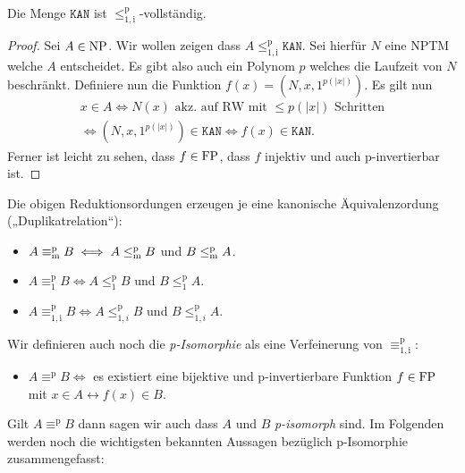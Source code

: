\begin{lemma}
    Die Menge $\mathtt{KAN}$ ist $\leq_\mathrm{1,i}^\mathrm{p}$-vollständig.
\end{lemma}
\begin{proof}
    Sei $A\in\mathrm{NP}$. Wir wollen zeigen dass $A \leq_\mathrm{1,i}^\mathrm{p} \mathtt{KAN}$. Sei hierfür $N$ eine NPTM welche $A$ entscheidet. Es gibt also auch ein Polynom $p$ welches die Laufzeit von $N$ beschränkt.
    Definiere nun die Funktion $f(x) = (N, x, 1^{p(|x|)})$. Es gilt nun
    \begin{gather*}
        x\in A \iff N(x)\text{ akz. auf RW mit $\leq p(|x|)$ Schritten}\\
        \iff (N, x, 1^{p(|x|)}) \in \mathtt{KAN} \iff f(x) \in \mathtt{KAN}.
    \end{gather*}
    Ferner ist leicht zu sehen, dass $f\in \mathrm{FP}$, dass $f$ injektiv und auch p-invertierbar ist.
\end{proof}

Die obigen Reduktionsordungen erzeugen je eine kanonische Äquivalenzordung („Duplikatrelation“):
\begin{itemize}
    \item $A\equiv_\mathrm{m}^\mathrm{p} B \iff A\leq_\mathrm{m}^\mathrm{p} B$ und $B\leq_\mathrm{m}^\mathrm{p} A$.
    \item $A\equiv_\mathrm{1}^\mathrm{p} B \iff A\leq_1^\mathrm{p} B$ und $B\leq_1^\mathrm{p} A$.
    \item $A\equiv_\mathrm{1,i}^\mathrm{p} B \iff A\leq_{1,i}^\mathrm{p} B$ und $B\leq_{1,i}^\mathrm{p} A$.
\end{itemize}
Wir definieren auch noch die \emph{p-Isomorphie} als eine Verfeinerung von $\equiv_\mathrm{1,i}^\mathrm{p}$:
\begin{itemize}
    \item $A\equiv^\mathrm{p} B \iff$ es existiert eine bijektive und p-invertierbare Funktion $f\in\mathrm{FP}$ mit $x\in A\leftrightarrow f(x)\in B$.
\end{itemize}
Gilt $A\equiv^\mathrm{p} B$ dann sagen wir auch dass $A$ und $B$ \emph{p-isomorph} sind.
Im Folgenden werden noch die wichtigsten bekannten Aussagen bezüglich p-Isomorphie zusammengefasst:

